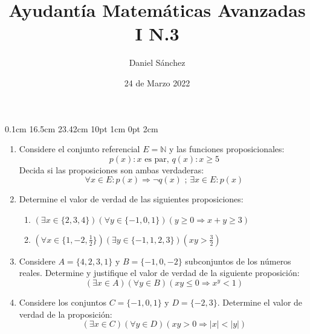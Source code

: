 \documentclass[12pt]{article}
\begin{document}
\setmargins{2.5cm}
{0.1cm}
{16.5cm}
{23.42cm}
{10pt}
{1cm}
{0pt}
{2cm}

\title{Ayudant\'ia Matem\'aticas Avanzadas I N.3}
\date{24 de Marzo 2022}
\author{Daniel S\'anchez}
\maketitle

\begin{enumerate}
      \item Considere el conjunto referencial $E=\mathbb{N}$ y las funciones proposicionales:
            $$p(x):x\mbox{ es par, } q(x):x\geq 5$$
            Decida si las proposiciones son ambas verdaderas:
            $$\forall x \in E: p(x) \Rightarrow \neg q(x)\mbox{ ; } \exists x \in E: p(x)$$
      \item Determine el valor de verdad de las siguientes proposiciones:
            \begin{enumerate}
                  \item $(\exists x \in \{2,3,4\})(\forall y \in \{-1,0,1\})(y\geq0 \Rightarrow x+y\geq 3)$
                  \item $(\forall x \in \{1,-2,\frac{1}{2}\})(\exists y \in \{-1,1,2,3\})(xy > \frac{3}{2})$
            \end{enumerate}
      \item Considere $A=\{4,2,3,1\} \mbox{ y } B=\{-1,0,-2\}$ subconjuntos de los n\'umeros reales. Determine y justifique
            el valor de verdad de la siguiente proposici\'on:
            $$(\exists x \in A)(\forall y \in B)(xy\leq 0 \Rightarrow x^{y}<1)$$
      \item Considere los conjuntos $C=\{-1,0,1\} \mbox{ y } D=\{-2,3\}$. Determine el valor de verdad de la proposici\'on:
            $$(\exists x \in C)(\forall y \in D)(xy>0 \Rightarrow |x|<|y|)$$
\end{enumerate}
\end{document}
